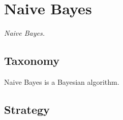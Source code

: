 
\section{Naive Bayes} 
\label{sec:naive_bayes}


\emph{Naive Bayes.}

\subsection{Taxonomy}
Naive Bayes is a Bayesian algorithm.

\subsection{Strategy}



